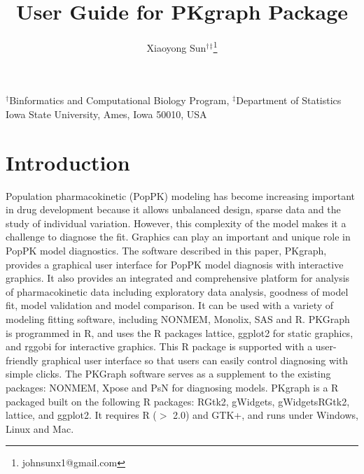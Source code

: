 \documentclass[a4paper]{article}
\author{Xiaoyong Sun$^\dagger$$^\ddagger$\footnote{johnsunx1@gmail.com}}
\begin{document}

\title{User Guide for PKgraph Package}
\maketitle
\begin{center}$^\dagger$Binformatics and Computational Biology Program, $^\ddagger$Department of Statistics \\ Iowa State University, Ames, Iowa 50010, USA
\end{center}

\tableofcontents

\section{Introduction}
Population pharmacokinetic (PopPK) modeling has become increasing important in
drug development because it allows unbalanced design, sparse data and the study
of individual variation. However, this complexity of the model makes it a challenge
to diagnose the fit.  Graphics can play an important and unique role in PopPK model diagnostics.
The software described in this paper, PKgraph, provides a graphical user interface for
PopPK model diagnosis with interactive graphics. It also provides an integrated and comprehensive platform for analysis
of pharmacokinetic data including exploratory data analysis, goodness of model fit,
model validation and model comparison. It can be used with a variety of modeling fitting software,
including NONMEM, Monolix, SAS and R. PKGraph is programmed in R, and uses the R packages
lattice, ggplot2 for static graphics, and rggobi for interactive graphics. This R package is
supported with a user-friendly graphical user interface so that users can easily control diagnosing
with simple clicks. The PKGraph software serves as a supplement to the existing packages:
NONMEM, Xpose and PsN for diagnosing models.
\newline
\newline
PKgraph is a R packaged built on the following R packages: RGtk2, gWidgets, gWidgetsRGtk2,
lattice, and ggplot2. It requires R ($>$ 2.0) and  GTK+, and runs under Windows, Linux and Mac.
\end{document}
